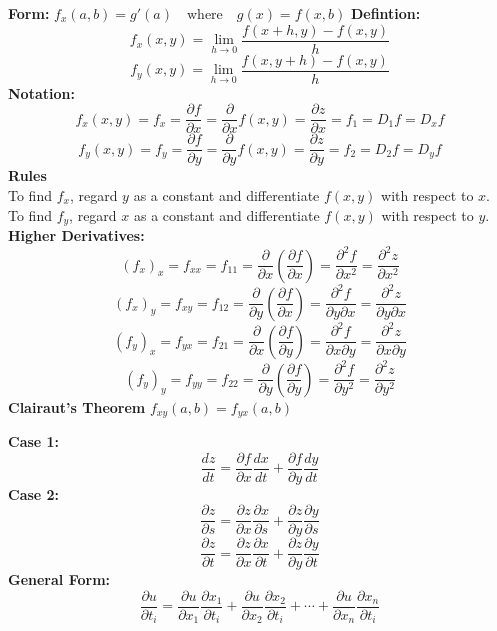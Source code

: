 \documentclass[2pt]{article}
\begin{document}
\begin{multicols}{2}
\begin{tcolorbox}[title=\textbf{Partial Derivatives}, colframe=lightblue]
    \textbf{Form:} 	$ f_x(a, b) = g'(a) \quad \text{where} \quad g(x) = f(x, b) $ 
    \textbf{Defintion:} 
    \[f_x(x, y) = \lim_{{h \to 0}} \frac{f(x + h, y) - f(x, y)}{h}\]
    \[f_y(x, y) = \lim_{{h \to 0}} \frac{f(x, y + h) - f(x, y)}{h}\]
    \textbf{Notation:} 
    \[ f_x(x, y) = f_x = \frac{\partial f}{\partial x} = \frac{\partial}{\partial x} f(x, y) = \frac{\partial z}{\partial x} = f_1 = D_1 f = D_x f \]
    \[ f_y(x, y) = f_y = \frac{\partial f}{\partial y} = \frac{\partial}{\partial y} f(x, y) = \frac{\partial z}{\partial y} = f_2 = D_2 f = D_y f \]
    \textbf{Rules} \\
    To find $f_x$, regard $y$ as a constant and differentiate $f(x, y)$ with respect to $x$.\\
    To find $f_y$, regard $x$ as a constant and differentiate $f(x, y)$ with respect to $y$. \\
    \textbf{Higher Derivatives:}
    \[(f_x)_x = f_{xx} = f_{11} = \frac{\partial}{\partial x} \left( \frac{\partial f}{\partial x} \right) = \frac{\partial^2 f}{\partial x^2} = \frac{\partial^2 z}{\partial x^2}\]
    \[(f_x)_y = f_{xy} = f_{12} = \frac{\partial}{\partial y} \left( \frac{\partial f}{\partial x} \right) = \frac{\partial^2 f}{\partial y \partial x} = \frac{\partial^2 z}{\partial y \partial x} \]
    \[ (f_y)_x = f_{yx} = f_{21} = \frac{\partial}{\partial x} \left( \frac{\partial f}{\partial y} \right) = \frac{\partial^2 f}{\partial x \partial y} = \frac{\partial^2 z}{\partial x \partial y} \]
    \[(f_y)_y = f_{yy} = f_{22} = \frac{\partial}{\partial y} \left( \frac{\partial f}{\partial y} \right) = \frac{\partial^2 f}{\partial y^2} = \frac{\partial^2 z}{\partial y^2} \]
    \textbf{Clairaut's Theorem} $ f_{xy}(a, b) = f_{yx}(a, b) $
\end{tcolorbox}

\begin{tcolorbox}[title=\textbf{Chain Rule}, colframe=lightblue]
    \textbf{Case 1:} 	
    \[ \frac{dz}{dt} = \frac{\partial f}{\partial x} \frac{dx}{dt} + \frac{\partial f}{\partial y} \frac{dy}{dt} \]
    \textbf{Case 2:}
    \[ \frac{\partial z}{\partial s} = \frac{\partial z}{\partial x} \frac{\partial x}{\partial s} + \frac{\partial z}{\partial y} \frac{\partial y}{\partial s} \]
    \[ \frac{\partial z}{\partial t} = \frac{\partial z}{\partial x} \frac{\partial x}{\partial t} + \frac{\partial z}{\partial y} \frac{\partial y}{\partial t} \]
    \textbf{General Form:}
    \[ \frac{\partial u}{\partial t_i} = \frac{\partial u}{\partial x_1} \frac{\partial x_1}{\partial t_i} + \frac{\partial u}{\partial x_2} \frac{\partial x_2}{\partial t_i} + \cdots + \frac{\partial u}{\partial x_n} \frac{\partial x_n}{\partial t_i} \]
\end{tcolorbox}


\end{multicols}
\end{document}
